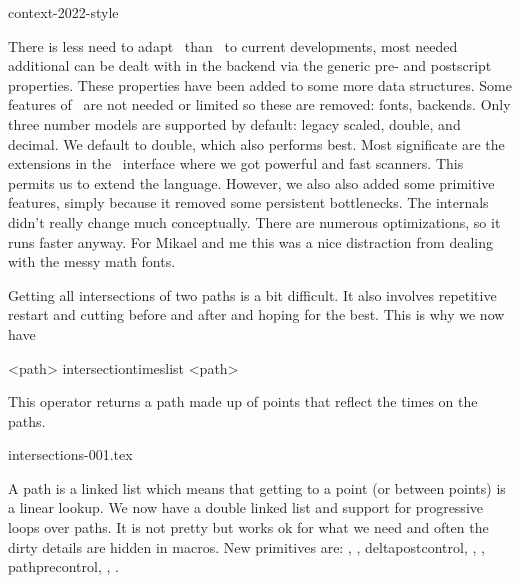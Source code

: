 
\environment context-2022-style

\startdocument
  [title={Stepping up \MetaPost},
   banner={convenience and performance},
   location={context\enspace {\bf 2022}\enspace meeting}]

\starttitle[title=\METAPOST\ version 2 versus 3]

\startitemize
    \startitem
        There is less need to adapt \METAPOST\ than \TEX\ to current
        developments, most needed additional can be dealt with in the backend via
        the generic pre- and postscript properties. These properties have been
        added to some more data structures.
    \stopitem
    \startitem
        Some features of \METAPOST\ are not needed or limited so these are
        removed: fonts, backends. Only three number models are supported by
        default: legacy scaled, double, and decimal. We default to double, which
        also performs best.
    \stopitem
    \startitem
        Most significate are the extensions in the \LUA\ interface where we
        got powerful and fast scanners. This permits us to extend the
        language.
    \stopitem
    \startitem
        However, we also also added some primitive features, simply because it
        removed some persistent bottlenecks. The internals didn't really change
        much conceptually. There are numerous optimizations, so it runs faster
        anyway.
    \stopitem
    \startitem
        For Mikael and me this was a nice distraction from dealing with the messy
        math fonts.
    \stopitem
\stopitemize

\stoptitle

\starttitle[title=Intersection]

Getting all intersections of two paths is a bit difficult. It also involves
repetitive restart and cutting before and after and hoping for the best. This is why
we now have

\starttyping
<path> intersectiontimeslist <path>
\stoptyping

This operator returns a path made up of points that reflect the times on the
paths.

\starttyping
intersections-001.tex
\stoptyping

\stoptitle

\starttitle[title=Loops]

\startitemize
    \startitem
        A path is a linked list which means that getting to a point (or between
        points) is a linear lookup.
    \stopitem
    \startitem
        We now have a double linked list and support for progressive loops over
        paths.
    \stopitem
    \startitem
        It is not pretty but works ok for what we need and often the dirty
        details are hidden in macros.
    \stopitem
    \startitem
        New primitives are: , , \type
        {deltapostcontrol}, , , \type
        {pathprecontrol}, , .
    \stopitem
\stopitemize

